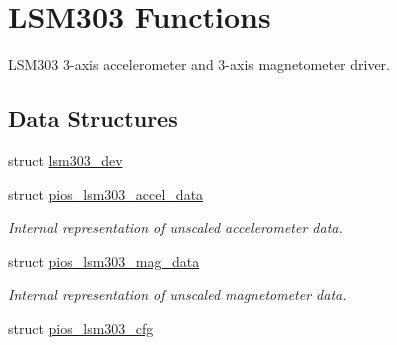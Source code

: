 \hypertarget{group___p_i_o_s___l_s_m303}{\section{L\-S\-M303 Functions}
\label{group___p_i_o_s___l_s_m303}
}


L\-S\-M303 3-\/axis accelerometer and 3-\/axis magnetometer driver.  


\subsection*{Data Structures}
\begin{DoxyCompactItemize}
\item 
struct \hyperlink{structlsm303__dev}{lsm303\-\_\-dev}
\item 
struct \hyperlink{structpios__lsm303__accel__data}{pios\-\_\-lsm303\-\_\-accel\-\_\-data}
\begin{DoxyCompactList}\small\item\em Internal representation of unscaled accelerometer data. \end{DoxyCompactList}\item 
struct \hyperlink{structpios__lsm303__mag__data}{pios\-\_\-lsm303\-\_\-mag\-\_\-data}
\begin{DoxyCompactList}\small\item\em Internal representation of unscaled magnetometer data. \end{DoxyCompactList}\item 
struct \hyperlink{structpios__lsm303__cfg}{pios\-\_\-lsm303\-\_\-cfg}
\end{DoxyCompactItemize}

